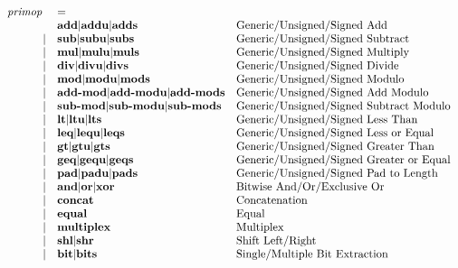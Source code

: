 \documentclass[12pt]{article}
\begin{document}
\[
\begin{array}{rll}
\text{\em primop\ }     &= \\
                &\text{\bf add} \vert \text{\bf addu} \vert \text{\bf adds}                             &\text{Generic/Unsigned/Signed Add}\\
\vert           &\text{\bf sub} \vert \text{\bf subu} \vert \text{\bf subs}                             &\text{Generic/Unsigned/Signed Subtract}\\
\vert           &\text{\bf mul} \vert \text{\bf mulu} \vert \text{\bf muls}                             &\text{Generic/Unsigned/Signed Multiply}\\
\vert           &\text{\bf div} \vert \text{\bf divu} \vert \text{\bf divs}                             &\text{Generic/Unsigned/Signed Divide}\\
\vert           &\text{\bf mod} \vert \text{\bf modu} \vert \text{\bf mods}                             &\text{Generic/Unsigned/Signed Modulo}\\
\vert           &\text{\bf add-mod} \vert \text{\bf add-modu} \vert \text{\bf add-mods}                 &\text{Generic/Unsigned/Signed Add Modulo}\\
\vert           &\text{\bf sub-mod} \vert \text{\bf sub-modu} \vert \text{\bf sub-mods}                 &\text{Generic/Unsigned/Signed Subtract Modulo}\\
\vert           &\text{\bf lt} \vert \text{\bf ltu} \vert \text{\bf lts}                                &\text{Generic/Unsigned/Signed Less Than}\\
\vert           &\text{\bf leq} \vert \text{\bf lequ} \vert \text{\bf leqs}                             &\text{Generic/Unsigned/Signed Less or Equal}\\
\vert           &\text{\bf gt} \vert \text{\bf gtu} \vert \text{\bf gts}                                &\text{Generic/Unsigned/Signed Greater Than}\\
\vert           &\text{\bf geq} \vert \text{\bf gequ} \vert \text{\bf geqs}                             &\text{Generic/Unsigned/Signed Greater or Equal}\\
\vert           &\text{\bf pad} \vert \text{\bf padu} \vert \text{\bf pads}                             &\text{Generic/Unsigned/Signed Pad to Length}\\
\vert           &\text{\bf and} \vert \text{\bf or} \vert \text{\bf xor}                                &\text{Bitwise And/Or/Exclusive Or}\\
\vert           &\text{\bf concat}                                                            &\text{Concatenation}\\
\vert           &\text{\bf equal}                                                             &\text{Equal}\\
\vert           &\text{\bf multiplex}                                                         &\text{Multiplex}\\
\vert           &\text{\bf shl} \vert \text{\bf shr}                                               &\text{Shift Left/Right}\\
\vert           &\text{\bf bit} \vert \text{\bf bits}                                              &\text{Single/Multiple Bit Extraction}\\
\end{array}
\]
\end{document}
